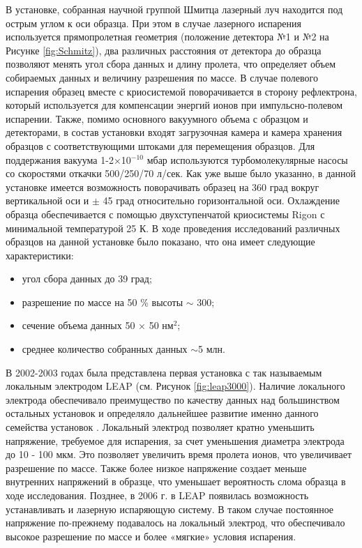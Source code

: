 В установке, собранная научной группой Шмитца лазерный луч находится под острым углом к оси образца. При этом в случае лазерного испарения используется прямопролетная геометрия (положение детектора №1 и №2 на Рисунке \cref{fig:Schmitz}), два различных расстояния от детектора до образца позволяют менять угол сбора данных и длину пролета, что определяет объем собираемых данных и величину разрешения по массе. В случае полевого испарения образец вместе с криосистемой поворачивается в сторону рефлектрона, который используется для компенсации энергий ионов при импульсно-полевом испарении. Также, помимо основного вакуумного объема с образцом и детекторами, в состав установки входят загрузочная камера и камера хранения образцов с соответствующими штоками для перемещения образцов. Для поддержания вакуума 1-2×10$^{-10}$ мбар используются турбомолекулярные насосы со скоростями откачки 500/250/70 л/сек. Как уже выше было указанно, в данной установке имеется возможность поворачивать образец на 360 град вокруг вертикальной оси и $\pm$ 45 град относительно горизонтальной оси. Охлаждение образца обеспечивается с помощью двухступенчатой криосистемы Rigon с минимальной температурой 25 К. В ходе проведения исследований различных образцов на данной установке было показано, что она имеет следующие характеристики:
\begin{itemize}[beginpenalty=10000] %
	\item угол сбора данных до 39 град;
	\item разрешение по массе на 50 \% высоты $\sim$ 300;
	\item сечение объема данных 50 × 50 нм$^{2}$;
	\item среднее количество собранных данных $\sim$5 млн.
\end{itemize}	

В 2002-2003 годах была представлена первая установка с так называемым локальным электродом LEAP (см. Рисунок \cref{fig:leap3000}). Наличие локального электрода обеспечивало преимущество по качеству данных над большинством остальных установок и определяло дальнейшее развитие именно данного семейства установок \cite{Kelly00}. Локальный электрод позволяет кратно уменьшить напряжение, требуемое для испарения, за счет уменьшения диаметра электрода до 10 - 100 мкм. Это позволяет увеличить время пролета ионов, что увеличивает разрешение по массе. Также более низкое напряжение создает меньше внутренних напряжений в образце, что уменьшает вероятность слома образца в ходе исследования. Позднее, в 2006 г. в LEAP появилась возможность устанавливать и лазерную испаряющую систему. В таком случае постоянное напряжение по-прежнему подавалось на локальный электрод, что обеспечивало высокое разрешение по массе и более «мягкие» условия испарения.

